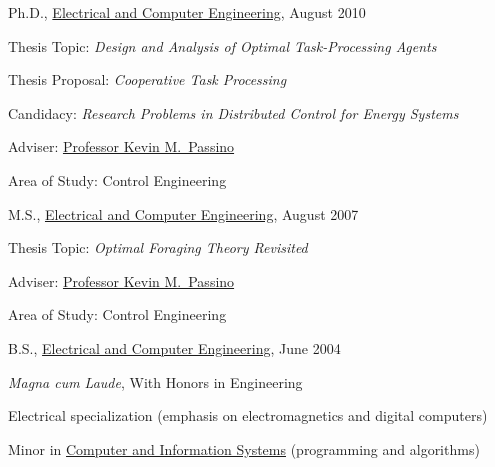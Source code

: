\documentclass[10pt]{article}
\newenvironment{outerlist}[1][\enskip\textbullet]%
        {\begin{itemize}[#1]}{\end{itemize}%
         \vspace{-.6\baselineskip}}
\newenvironment{innerlist}[1][\enskip\textbullet]%
        {\begin{compactitem}[#1]}{\end{compactitem}}
\begin{document}
\begin{outerlist}

\item[] Ph.D.,
        \href{http://www.ece.osu.edu/}
             {Electrical and Computer Engineering},
             August 2010
        \begin{innerlist}
        \item Thesis Topic: \emph{Design and Analysis of Optimal
            Task-Processing Agents}
        \item Thesis Proposal: \emph{Cooperative Task Processing}
        \item Candidacy: \emph{Research
            Problems in Distributed Control for Energy Systems}
        \item Adviser:
              \href{http://www.ece.osu.edu/~passino/}
                   {Professor Kevin M.~Passino}
        \item Area of Study: Control Engineering
        \end{innerlist}

\item[] M.S.,
        \href{http://www.ece.osu.edu/}
             {Electrical and Computer Engineering}, August 2007
        \begin{innerlist}
        \item Thesis Topic: \emph{Optimal Foraging Theory Revisited}
        \item Adviser:
              \href{http://www.ece.osu.edu/~passino/}
                   {Professor Kevin M.~Passino}
        \item Area of Study: Control Engineering
        \end{innerlist}

\item[] B.S.,
        \href{http://www.ece.osu.edu/}
             {Electrical and Computer Engineering}, June 2004
        \begin{innerlist}
        \item \emph{Magna cum Laude}, With Honors in Engineering
        \item Electrical specialization (emphasis on electromagnetics and digital computers)
        \item Minor in \href{http://www.cse.ohio-state.edu/}
                            {Computer and Information Systems}
              (programming and algorithms)
        \end{innerlist}

\end{outerlist}
\end{document}
